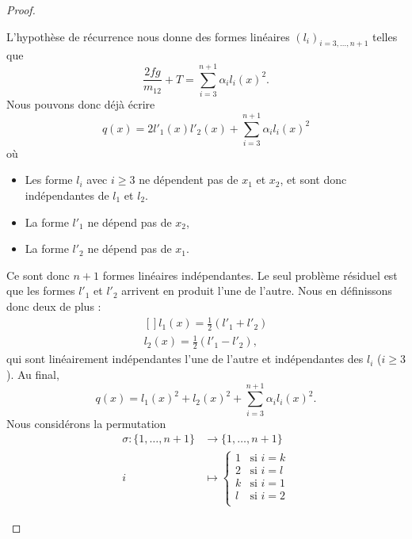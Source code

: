 \begin{proof}
\begin{subproof}
		L'hypothèse de récurrence nous donne des formes linéaires \( (l_i)_{i=3,\ldots, n+1}\) telles que
		\begin{equation}
			\frac{ 2fg }{ m_{12} }+T=\sum_{i=3}^{n+1}\alpha_il_i(x)^2.
		\end{equation}
		Nous pouvons donc déjà écrire
		\begin{equation}
			q(x)=2l'_1(x)l'_2(x)+\sum_{i=3}^{n+1}\alpha_il_i(x)^2
		\end{equation}
		où
		\begin{itemize}
			\item Les forme \( l_i\) avec \( i\geq 3\) ne dépendent pas de \( x_1\) et \( x_2\), et sont donc indépendantes de \( l_1\) et \( l_2\).
			\item La forme \( l'_1\) ne dépend pas de \( x_2\),
			\item La forme \( l'_2\) ne dépend pas de \( x_1\).
		\end{itemize}
		Ce sont donc \( n+1\) formes linéaires indépendantes. Le seul problème résiduel est que les formes \( l'_1\) et \( l'_2\) arrivent en produit l'une de l'autre. Nous en définissons donc deux de plus :
		\begin{equation}
			\begin{aligned}[]
				l_1(x)=\frac{ 1 }{2}(l'_1+l'_2) \\
				l_2(x)=\frac{ 1 }{2}(l'_1-l'_2),
			\end{aligned}
		\end{equation}
		qui sont linéairement indépendantes l'une de l'autre et indépendantes des \( l_i\) (\( i\geq 3\)). Au final,
		\begin{equation}
			q(x)=l_1(x)^2+l_2(x)^2+\sum_{i=3}^{n+1}\alpha_il_i(x)^2.
		\end{equation}
		\spitem[Si \( m_{ii}=0\) et \( m_{12}=0\) et \( m_{kl}\neq 0\) avec \( k<l\)]
		Nous considérons la permutation
		\begin{equation}
			\begin{aligned}
				\sigma\colon \{ 1,\ldots, n+1 \} & \to \{ 1,\ldots, n+1 \}    \\
				i                                & \mapsto \begin{cases}
					                                           1 & \text{si } i=k \\
					                                           2 & \text{si } i=l \\
					                                           k & \text{si } i=1 \\
					                                           l & \text{si } i=2 \\

\end{cases}
\end{aligned}
\end{equation}
\end{subproof}
\end{proof}
